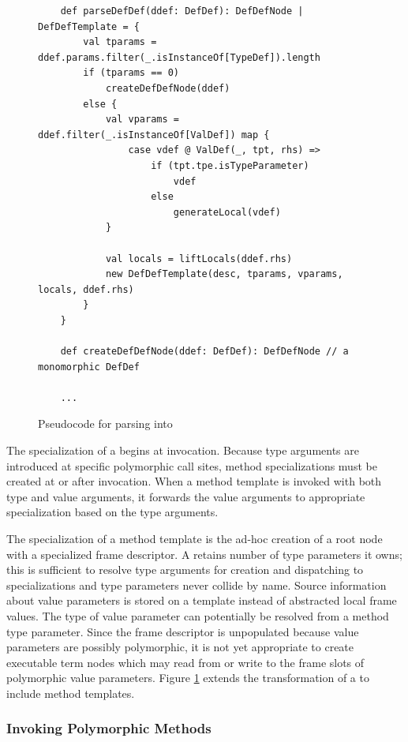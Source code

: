 \begin{figure}[!htb]
	\begin{verbatim}
	def parseDefDef(ddef: DefDef): DefDefNode | DefDefTemplate = {		
		val tparams = ddef.params.filter(_.isInstanceOf[TypeDef]).length
		if (tparams == 0)
			createDefDefNode(ddef)
		else {
			val vparams = ddef.filter(_.isInstanceOf[ValDef]) map {
				case vdef @ ValDef(_, tpt, rhs) => 
					if (tpt.tpe.isTypeParameter) 
						vdef
					else
						generateLocal(vdef)
			}
		
			val locals = liftLocals(ddef.rhs)
			new DefDefTemplate(desc, tparams, vparams, locals, ddef.rhs)
		}
	}

	def createDefDefNode(ddef: DefDef): DefDefNode // a monomorphic DefDef
		
	...
	\end{verbatim}
	\caption{Pseudocode for parsing  into }
	\label{impl:parse-poly-defdef}
\end{figure}

The specialization of a  begins at invocation.
Because type arguments are introduced at specific polymorphic call sites, method specializations must be created at or after invocation.
When a method template is invoked with both type and value arguments, it forwards the value arguments to appropriate specialization based on the type arguments.

The specialization of a method template is the ad-hoc creation of a root node with a specialized frame descriptor.
A  retains number of type parameters it owns; this is sufficient to resolve type arguments for creation and dispatching to specializations and type parameters never collide by name.
Source information about value parameters is stored on a template instead of abstracted local frame values.
The type of value parameter can potentially be resolved from a method type parameter.
Since the frame descriptor is unpopulated because value parameters are possibly polymorphic, it is not yet appropriate to create executable term nodes which may read from or write to the frame slots of polymorphic value parameters.
Figure \ref{impl:parse-poly-defdef} extends the transformation of a  to include method templates.

\subsubsection*{Invoking Polymorphic Methods}

